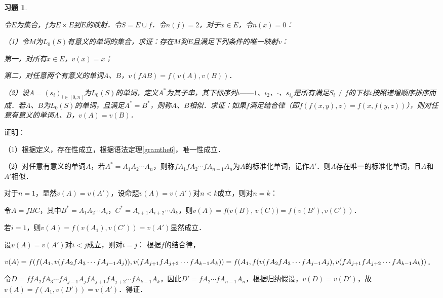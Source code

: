 \documentclass[12pt, a4paper, oneside]{book}
\newtheorem{exer}{习题}
\begin{document}
			\begin{exer}\label{exer30}
				\hfill\par
				令$E$为集合，$f$为$E\times E$到$E$的映射．令$S=E\cup{f}$．令$n(f)=2$，对于$x\in E$，令$n(x)=0$：
				\par
				（1）令$M$为$L_0(S)$有意义的单词的集合，求证：存在$M$到$E$且满足下列条件的唯一映射v：
				\par
				第一，对所有$x\in E$，$v(x)=x$；
				\par
				第二，对任意两个有意义的单词$A$、$B$，$v(fAB)=f(v(A), v(B))$．
				\par
				（2）设$A=(s_i)_{i\in [0, n]}$为$L_0(S)$的单词，定义$A^*$为其子串，其下标序列$i——1$、$i_2$、$\cdot$、$s_{i_k}$是所有满足$S_i\neq f$的下标$i$按照递增顺序排序而成．若$A$、$B$为$L_0(S)$的单词，且满足$A^*=B^*$，则称$A$、$B$相似．求证：如果$f$满足结合律（即$f(f(x, y), z) = f (x, f(y, z))$），则对任意有意义的单词$A$、$B$，$v(A)=v(B)$．				
			\end{exer}
			证明：
			\par
			（1）根据定义，存在性成立，根据语法定理\ref{gramthe6}，唯一性成立．
			\par
			（2）对任意有意义的单词$A$，若$A^*=A_1A_2\cdots A_n$，则称$fA_1fA_2\cdots fA_{n-1}A_n$为$A$的标准化单词，记作$A'$．则$A$存在唯一的标准化单词，且$A$和$A'$相似．
			\par
			对于$n=1$，显然$v(A)=v(A')$，设命题$v(A)=v(A')$对$n<k$成立，则对$n=k$：
			\par
			令$A=fBC$，其中$B^*=A_1A_2\cdots A_i$，$C^*=A_{i+1}A_{i+2}\cdots A_k$，则$v(A)=f(v(B)$, $v(C))= f(v(B'), v(C'))$．
			\par
			若$i=1$，则$v(A)=f(v(A_1), v(C'))=v(A')$显然成立．
			\par
			设$v(A)=v(A')$对$i<j$成立，则对$i=j$： 根据$f$的结合律，
			\par
			$v(A)=f(f(A_1, v(fA_2fA_3\cdots fA_{j-1}A_j)), v(fA_{j+1}fA_{j+2}\cdots fA_{k-1}A_k))=\\f(A_1, f(v(fA_2fA_3\cdots fA_{j-1}A_j), v(fA_{j+1}fA_{j+2}\cdots fA_{k-1}A_k))$．
			\par
			令$D=ffA_2fA_3\cdots fA_{j-1}A_jfA_{j+1}fA_{j+2}\cdots fA_{k-1}A_k$，因此$D'=fA_2\cdots fA_{n-1}A_n$，根据归纳假设，$v(D)=v(D')$，故$v(A)=f(A_1, v(D'))=v(A')$．得证．
			
\end{document}
